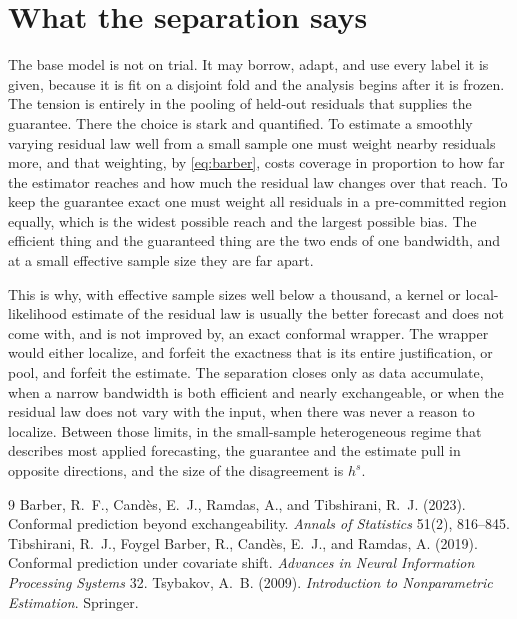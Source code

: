 \documentclass[11pt]{article}
\theoremstyle{definition}
\theoremstyle{remark}
\begin{document}
\section{What the separation says}

The base model is not on trial. It may borrow, adapt, and use every label it is given,
because it is fit on a disjoint fold and the analysis begins after it is frozen. The
tension is entirely in the pooling of held-out residuals that supplies the guarantee.
There the choice is stark and quantified. To estimate a smoothly varying residual law
well from a small sample one must weight nearby residuals more, and that weighting, by
\eqref{eq:barber}, costs coverage in proportion to how far the estimator reaches and how
much the residual law changes over that reach. To keep the guarantee exact one must weight
all residuals in a pre-committed region equally, which is the widest possible reach and the
largest possible bias. The efficient thing and the guaranteed thing are the two ends of one
bandwidth, and at a small effective sample size they are far apart.

This is why, with effective sample sizes well below a thousand, a kernel or local-likelihood
estimate of the residual law is usually the better forecast and does not come with, and is
not improved by, an exact conformal wrapper. The wrapper would either localize, and forfeit
the exactness that is its entire justification, or pool, and forfeit the estimate. The
separation closes only as data accumulate, when a narrow bandwidth is both efficient and
nearly exchangeable, or when the residual law does not vary with the input, when there was
never a reason to localize. Between those limits, in the small-sample heterogeneous regime
that describes most applied forecasting, the guarantee and the estimate pull in opposite
directions, and the size of the disagreement is $h^{s}$.


\begin{thebibliography}{9}
 Barber, R.~F., Cand\`es, E.~J., Ramdas,
  A., and Tibshirani, R.~J. (2023). Conformal prediction beyond exchangeability.
  \emph{Annals of Statistics} 51(2), 816--845.
 Tibshirani, R.~J., Foygel
  Barber, R., Cand\`es, E.~J., and Ramdas, A. (2019). Conformal prediction under
  covariate shift. \emph{Advances in Neural Information Processing Systems} 32.
 Tsybakov, A.~B. (2009).
  \emph{Introduction to Nonparametric Estimation}. Springer.
\end{thebibliography}
\end{document}
